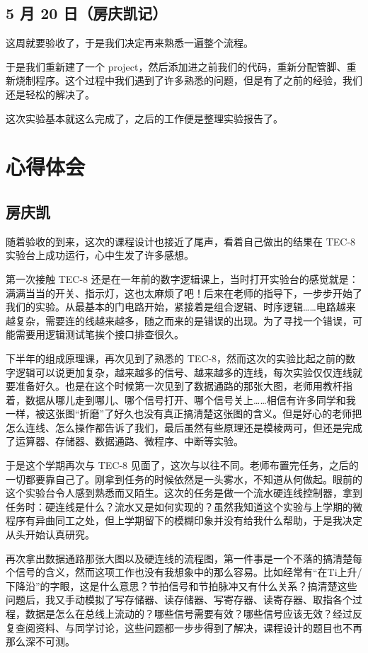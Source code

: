 \documentclass[12pt]{article}
\begin{document}
{    \subsection{5 月 20 日（房庆凯记）}
        这周就要验收了，于是我们决定再来熟悉一遍整个流程。
        
        于是我们重新建了一个 project，然后添加进之前我们的代码，重新分配管脚、重新烧制程序。这个过程中我们遇到了许多熟悉的问题，但是有了之前的经验，我们还是轻松的解决了。
        
        这次实验基本就这么完成了，之后的工作便是整理实验报告了。
    
\section{心得体会}
    \subsection{房庆凯}
    	随着验收的到来，这次的课程设计也接近了尾声，看着自己做出的结果在 TEC-8 实验台上成功运行，心中生发了许多感想。
    	
	第一次接触 TEC-8 还是在一年前的数字逻辑课上，当时打开实验台的感觉就是：满满当当的开关、指示灯，这也太麻烦了吧！后来在老师的指导下，一步步开始了我们的实验。从最基本的门电路开始，紧接着是组合逻辑、时序逻辑……电路越来越复杂，需要连的线越来越多，随之而来的是错误的出现。为了寻找一个错误，可能需要用逻辑测试笔挨个接口排查很久。
	
	下半年的组成原理课，再次见到了熟悉的 TEC-8，然而这次的实验比起之前的数字逻辑可以说更加复杂，越来越多的信号、越来越多的连线，每次实验仅仅连线就要准备好久。也是在这个时候第一次见到了数据通路的那张大图，老师用教杆指着，数据从哪儿走到哪儿、哪个信号打开、哪个信号关上……相信有许多同学和我一样，被这张图“折磨”了好久也没有真正搞清楚这张图的含义。但是好心的老师把怎么连线、怎么操作都告诉了我们，最后虽然有些原理还是模棱两可，但还是完成了运算器、存储器、数据通路、微程序、中断等实验。
	
	于是这个学期再次与 TEC-8 见面了，这次与以往不同。老师布置完任务，之后的一切都要靠自己了。刚拿到任务的时候依然是一头雾水，不知道从何做起。眼前的这个实验台令人感到熟悉而又陌生。这次的任务是做一个流水硬连线控制器，拿到任务时：硬连线是什么？流水又是如何实现的？虽然我知道这个实验与上学期的微程序有异曲同工之处，但上学期留下的模糊印象并没有给我什么帮助，于是我决定从头开始认真研究。
	
	再次拿出数据通路那张大图以及硬连线的流程图，第一件事是一个不落的搞清楚每个信号的含义，然而这项工作也没有我想象中的那么容易。比如经常有“在Ti上升/下降沿”的字眼，这是什么意思？节拍信号和节拍脉冲又有什么关系？搞清楚这些问题后，我又手动模拟了写存储器、读存储器、写寄存器、读寄存器、取指各个过程，数据是怎么在总线上流动的？哪些信号需要有效？哪些信号应该无效？经过反复查阅资料、与同学讨论，这些问题都一步步得到了解决，课程设计的题目也不再那么深不可测。
	
}
\end{document}
